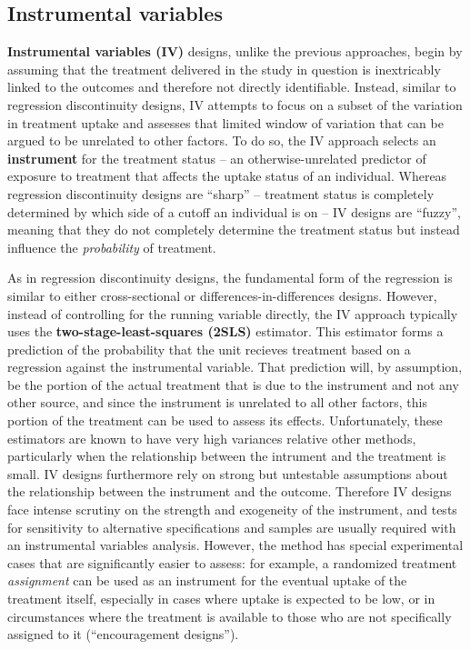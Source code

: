 \subsection{Instrumental variables}

\textbf{Instrumental variables (IV)} designs, unlike the previous approaches,
begin by assuming that the treatment delivered in the study in question is
inextricably linked to the outcomes and therefore not directly identifiable.
Instead, similar to regression discontinuity designs,
IV attempts to focus on a subset of the variation in treatment uptake
and assesses that limited window of variation that can be argued
to be unrelated to other factors.\cite{angrist2001instrumental}
To do so, the IV approach selects an \textbf{instrument}
for the treatment status -- an otherwise-unrelated predictor of exposure to treatment
that affects the uptake status of an individual.
Whereas regression discontinuity designs are ``sharp'' --
treatment status is completely determined by which side of a cutoff an individual is on --
IV designs are ``fuzzy'', meaning that they do not completely determine
the treatment status but instead influence the \textit{probability} of treatment.

As in regression discontinuity designs,
the fundamental form of the regression
is similar to either cross-sectional or differences-in-differences designs.
However, instead of controlling for the running variable directly,
the IV approach typically uses the \textbf{two-stage-least-squares (2SLS)} estimator.
This estimator forms a prediction of the probability that the unit recieves treatment
based on a regression against the instrumental variable.
That prediction will, by assumption, be the portion of the actual treatment
that is due to the instrument and not any other source,
and since the instrument is unrelated to all other factors,
this portion of the treatment can be used to assess its effects.
Unfortunately, these estimators are known
to have very high variances relative other methods,
particularly when the relationship between the intrument and the treatment is small.\cite{young2017consistency}
IV designs furthermore rely on strong but untestable assumptions
about the relationship between the instrument and the outcome.\cite{bound1995problems}
Therefore IV designs face intense scrutiny on the strength and exogeneity of the instrument,
and tests for sensitivity to alternative specifications and samples
are usually required with an instrumental variables analysis.
However, the method has special experimental cases that are significantly easier to assess:
for example, a randomized treatment \textit{assignment} can be used as an instrument
for the eventual uptake of the treatment itself,
especially in cases where uptake is expected to be low,
or in circumstances where the treatment is available
to those who are not specifically assigned to it (``encouragement designs'').

